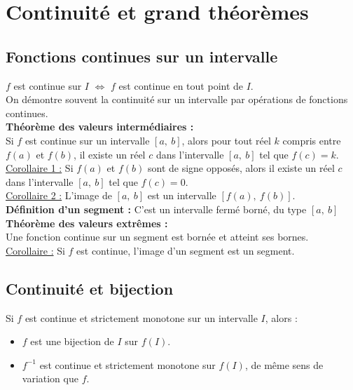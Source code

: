 \section{Continuité et grand théorèmes}\label{sec:continuite-et-grand-theoremes}

    \subsection{Fonctions continues sur un intervalle}\label{subsec:fonctions-continues-sur-un-intervalle}

        $f$ est continue sur $I$ $\iff$ $f$ est continue en tout point de $I$.\\
        On démontre souvent la continuité sur un intervalle par opérations de fonctions continues.\\

        \textbf{Théorème des valeurs intermédiaires :}\\
        Si $f$ est continue sur un intervalle $[a,\ b]$, alors pour tout réel $k$ compris entre $f(a)$ et $f(b)$, il existe un réel $c$ dans l'intervalle $[a,\ b]$ tel que $f(c) = k$.\\

        \underline{Corollaire 1 :} Si $f(a)$ et $f(b)$ sont de signe opposés, alors il existe un réel $c$ dans l'intervalle $[a,\ b]$ tel que $f(c) = 0$.\\
        \underline{Corollaire 2 :} L'image de $[a,\ b]$ est un intervalle $[f(a),\ f(b)]$.\\

        \textbf{Définition d'un segment :} C'est un intervalle fermé borné, du type $[a,\ b]$\\

        \textbf{Théorème des valeurs extrêmes :}\\
        Une fonction continue sur un segment est bornée et atteint ses bornes.\\
        \underline{Corollaire :} Si $f$ est continue, l'image d'un segment est un segment.\\

    \subsection{Continuité et bijection}\label{subsec:continuite-et-bijection}

        Si $f$ est continue et strictement monotone sur un intervalle $I$, alors :
        \begin{itemize}
            \item $f$ est une bijection de $I$ sur $f(I)$.
            \item $f^{-1}$ est continue et strictement monotone sur $f(I)$, de même sens de variation que $f$.
        \end{itemize}


